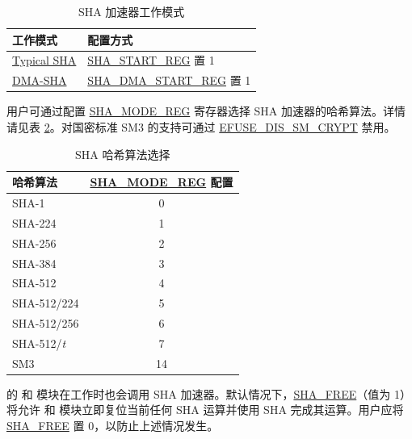 \documentclass[main\_\_CN.tex]{subfiles}
\begin{document}
\begin{longtable}[c]{ |l|l| }
\caption{SHA 加速器工作模式}
\label{tab:sha-hash-algo-select}
\\\hline
\rowcolor{lightgray}
\textbf{工作模式}      & \textbf{配置方式}\\
    \hline
    \hyperref[sec:sha-typical-sha]{Typical SHA}      &  \hyperref[regdesc:SHASTARTREG]{SHA\_START\_REG} 置 1   \\
    \hline
    \hyperref[sec:sha-dma-sha]{DMA-SHA}           &  \hyperref[regdesc:SHADMASTARTREG]{SHA\_DMA\_START\_REG} 置 1   \\
    \hline
\end{longtable}

用户可通过配置 \hyperref[regdesc:SHAMODEREG]{SHA\_MODE\_REG} 寄存器选择 SHA 加速器的哈希算法。详情请见表 \ref{tab:sha-mode-summ}。对国密标准 SM3 的支持可通过 \hyperref[fielddesc:EFUSEDISSMCRYPT]{EFUSE\_DIS\_SM\_CRYPT} 禁用。

\begin{longtable}[c]{|l|c|}
\caption{SHA 哈希算法选择}
\label{tab:sha-mode-summ}
\\\hline
\rowcolor{lightgray}
\textbf{哈希算法} & \textbf{\hyperref[regdesc:SHAMODEREG]{SHA\_MODE\_REG} 配置}\\\hline
    SHA-1               & 0  \\\hline
    SHA-224             & 1  \\\hline
    SHA-256             & 2  \\\hline
    SHA-384             & 3  \\\hline
    SHA-512             & 4  \\\hline
    SHA-512/224         & 5  \\\hline
    SHA-512/256         & 6  \\\hline
    SHA-512/{\it{t}}    & 7  \\\hline
    SM3                 & 14 \\\hline
\end{longtable}


\begin{importantlisting}
\vspace{-0.5em}

    \chipname{} 的  和  模块在工作时也会调用 SHA 加速器。默认情况下，\hyperref[fielddesc:SHAFREE]{SHA\_FREE}（值为 1）将允许  和  模块立即复位当前任何 SHA 运算并使用 SHA 完成其运算。用户应将 \hyperref[fielddesc:SHAFREE]{SHA\_FREE} 置 0，以防止上述情况发生。
\end{importantlisting}
\end{document}
